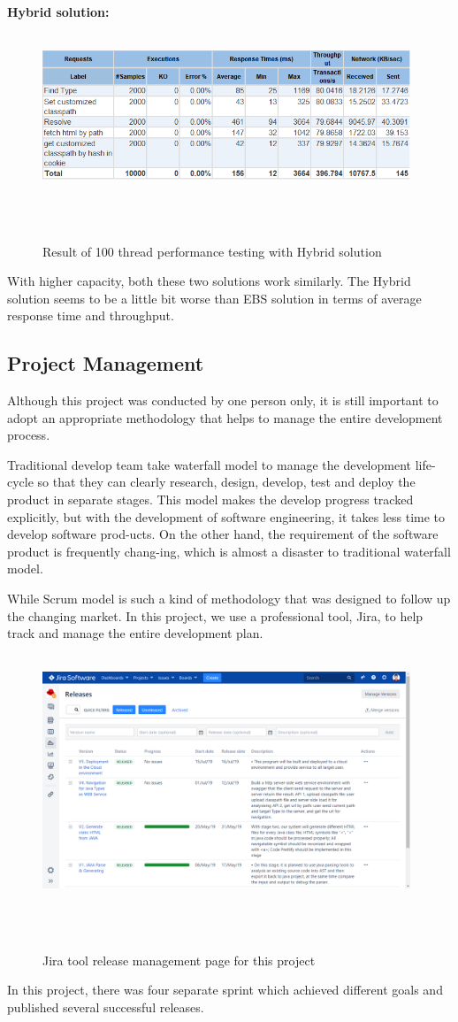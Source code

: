 \documentclass[runningheads]{llncs}
\begin{document}
\textbf{Hybrid solution:}
\begin{figure}[H]
    \centering
    \includegraphics[width=11cm]{pic/jmeter-100-hybrid.png}
    \caption{Result of 100 thread performance testing with Hybrid solution}
    \label{Result of 100 thread performance testing with Hybrid solution}
\end{figure}

With higher capacity, both these two solutions work similarly. The Hybrid solution seems to be a little bit worse than EBS solution in terms of average response time and throughput.

\subsection{Project Management}
Although this project was conducted by one person only, it is still important to adopt an appropriate methodology that helps to manage the entire development process.

Traditional develop team take waterfall\cite{Waterfall_model} model to manage the development life-cycle so that they can clearly research, design, develop, test and deploy the product in separate stages. This model makes the develop progress tracked explicitly, but with the development of software engineering, it takes less time to develop software prod-ucts. On the other hand, the requirement of the software product is frequently chang-ing, which is almost a disaster to traditional waterfall model.

While Scrum\cite{Scrum} model is such a kind of methodology that was designed to follow up the changing market. In this project, we use a professional tool, Jira\cite{jira}, to help track and manage the entire development plan.

\begin{figure}[H]
    \centering
    \includegraphics[width=11cm]{pic/jira.png}
    \caption{Jira tool release management page for this project}
    \label{Jira tool release management page for this project}
\end{figure}
In this project, there was four separate sprint which achieved different goals and published several successful releases. 
\end{document}
